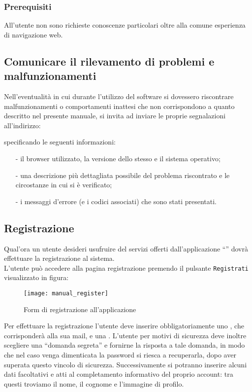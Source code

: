 \subsubsection{Prerequisiti}
All'utente non sono richieste conoscenze particolari oltre alla comune esperienza di navigazione web.

\subsection{Comunicare il rilevamento di problemi e malfunzionamenti}
Nell'eventualità in cui durante l'utilizzo del software \caName{} si dovessero riscontrare malfunzionamenti o comportamenti inattesi che non corrispondono a quanto descritto nel presente manuale, si invita ad inviare le proprie segnalazioni all'indirizzo:
\begin{center}
  \email{}
\end{center}
specificando le seguenti informazioni:
\begin{itemize}[noitemsep,nolistsep]
  \item[-] il browser utilizzato, la versione dello stesso e il sistema operativo;
  \item[-] una descrizione più dettagliata possibile del problema riscontrato e le circostanze in cui si è verificato;
  \item[-] i messaggi d'errore (e i codici associati) che sono stati presentati.
\end{itemize}

\subsection{Registrazione}
Qual'ora un utente desideri usufruire del servizi offerti dall'applicazione ``\caName'' dovrà effettuare la registrazione al sistema.\\
L'utente può accedere alla pagina registrazione premendo il pulsante \texttt{Registrati} visualizzato in figura:

\begin{figure}[H]
  \texttt{[image: manual\_register]}
\caption{Form di registrazione all'applicazione}\label{fig:register}
\end{figure}

Per effettuare la registrazione l'utente deve inserire obbligatoriamente uno \underline{}, che corrisponderà alla sua mail, e una .
L'utente per motivi di sicurezza deve inoltre scegliere una ``domanda segreta'' e fornirne la risposta a tale domanda, in modo che nel caso venga dimenticata la password si riesca a recuperarla, dopo aver superata questo vincolo di sicurezza.
Successivamente si potranno inserire alcuni dati facoltativi e atti al completamento informativo del proprio account: tra questi troviamo il nome, il cognome e l'immagine di profilo.

